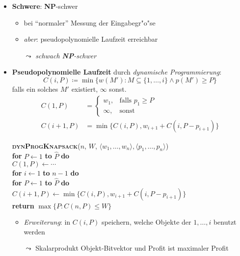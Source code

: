 \begin{itemize}
  \item \textbf{Schwere}: \textbf{NP}-schwer
  \begin{itemize}
    \item bei ``normaler'' Messung der Eingabegr"o"se
    \item \emph{aber}: pseudopolynomielle Laufzeit erreichbar
    \item[$ \leadsto $] \emph{schwach \textbf{NP}-schwer}
  \end{itemize}
  \item \textbf{Pseudopolynomielle Laufzeit} durch \emph{dynamische Programmierung}:
  \begin{equation*}
    C(i,P) \coloneqq \min\{ w(M') : M \subseteq \{ 1, \dots, i \} \wedge p(M') \geq P \}
  \end{equation*}
  falls ein solches $ M' $ existiert, $ \infty $ sonst.
  \begin{align*}
    C(1,P) &= \begin{cases}
      w_1, &\text{falls } p_1 \geq P \\
      \infty, &\text{sonst}
    \end{cases} \\
    C(i+1, P) &= \min\{ C(i,P), w_{i+1}+C(i,P-p_{i+1}) \}
  \end{align*}
  \begin{pseudocode}
    \textsc{\textbf{dynProgKnapsack}}($ n $, $ W $, $ \langle w_1, \dots, w_n \rangle, \langle p_1, \dots, p_n \rangle $) \\
    \textbf{for} $ P \leftarrow 1 $ \textbf{to} $ \hat{P} $ \textbf{do} \\
    \phantom{\quad} $ C(1,P) \leftarrow \cdots $ \\
    \textbf{for} $ i \leftarrow 1 $ \textbf{to} $ n - 1 $ \textbf{do} \\
    \phantom{\quad} \textbf{for} $ P \leftarrow 1 $ \textbf{to} $ \hat{P} $ \textbf{do} \\
    \phantom{\quad} \phantom{\quad} $ C(i+1, P) \leftarrow \min\{ C(i,P), w_{i+1}+C(i,P-p_{i+1}) \} $ \\
    \textbf{return} $ \max\{ P : C(n,P) \leq W \} $
  \end{pseudocode}
  \begin{itemize}
    \item \emph{Erweiterung}: in $ C(i,P) $ speichern, welche Objekte der $ 1,\dots,i $ benutzt werden
    \item[$ \leadsto $] Skalarprodukt Objekt-Bitvektor und Profit ist maximaler Profit
  \end{itemize}
\end{itemize}

